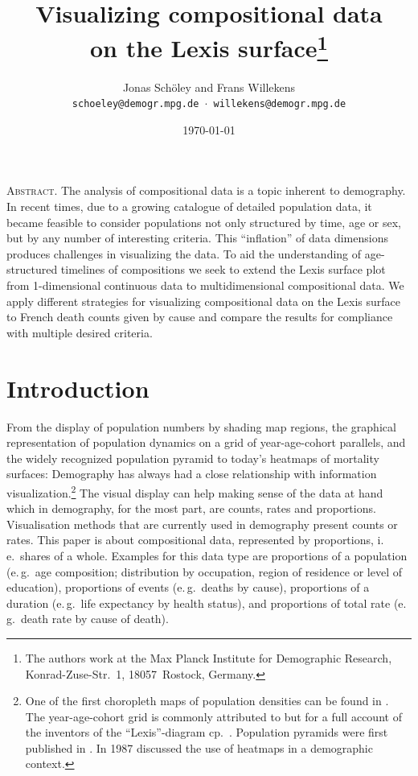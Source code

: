 \documentclass[a4paper]{scrartcl}
\title{Visualizing compositional data\\on the Lexis surface\footnote{
The authors work at the Max Planck Institute for Demographic Research, Konrad-Zuse-Str.~1, 18057~Rostock, Germany.}}
\author{Jonas Schöley and Frans Willekens\\
\texttt{schoeley@demogr.mpg.de $\cdot$ willekens@demogr.mpg.de}}
\date{\today}
\newenvironment{abstract2}{
  \begin{center}
      \begin{minipage}{0.9\linewidth}\small
      \textsc{Abstract.}}{\\
      \end{minipage}
  \end{center}
}
\begin{document}
\maketitle


\begin{abstract2}
The analysis of compositional data is a topic inherent to demography. In recent times, due to a growing catalogue of detailed population data, it became feasible to consider populations not only structured by time, age or sex, but by any number of interesting criteria. This \enquote{inflation} of data dimensions produces challenges in visualizing the data. To aid the understanding of age-structured timelines of compositions we seek to extend the Lexis surface plot from 1-dimensional continuous data to multidimensional compositional data. We apply different strategies for visualizing compositional data on the Lexis surface to French death counts given by cause and compare the results for compliance with multiple desired criteria.
\end{abstract2}

\section*{Introduction}

From the display of population numbers by shading map regions, the graphical representation of population dynamics on a grid of year-age-cohort parallels, and the widely recognized population pyramid to today's heatmaps of mortality surfaces: Demography has always had a close relationship with information visualization.\footnote{One of the first choropleth maps of population densities can be found in \textcite{Dangeville1836}. The year-age-cohort grid is commonly attributed to \textcite{Lexis1875} but for a full account of the inventors of the \enquote{Lexis}-diagram cp.~\textcite{Vandeschrick2001}. Population pyramids were first published in \textcite{Walker1874}. In 1987 \textcite{Vaupel1987} discussed the use of heatmaps in a demographic context.} The visual display can help making sense of the data at hand which in demography, for the most part, are counts, rates and proportions. Visualisation methods that are currently used in demography present counts or rates. This paper is about compositional data, represented by proportions, i.\,e.~shares of a whole. Examples for this data type are proportions of a population (e.\,g.~age composition; distribution by occupation, region of residence or level of education), proportions of events (e.\,g.~deaths by cause), proportions of a duration (e.\,g.~life expectancy by health status), and proportions of total rate (e.\,g.~death rate by cause of death).
\end{document}
